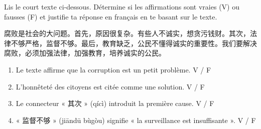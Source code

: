 \documentclass[11pt]{article}
\begin{document}
\begin{exercice}
Lis le court texte ci-dessous. Détermine si les affirmations sont vraies (V) ou fausses (F) et justifie ta réponse en français en te basant sur le texte.

\begin{textebox}
腐败是社会的大问题。首先，原因很复杂。有些人不诚实，想贪污钱财。其次，法律不够严格，监督不够。最后，教育缺乏，公民不懂得诚实的重要性。我们要解决腐败，必须加强法律，加强教育，培养诚实的公民。
\end{textebox}

\begin{enumerate}
    \item Le texte affirme que la corruption est un petit problème. \hfill V / F
    \item L'honnêteté des citoyens est citée comme une solution. \hfill V / F
    \item Le connecteur « 其次 » (qícì) introduit la première cause. \hfill V / F
    \item « 监督不够 » (jiāndū bùgòu) signifie « la surveillance est insuffisante ». \hfill V / F
\end{enumerate}
\end{exercice}
\end{document}
